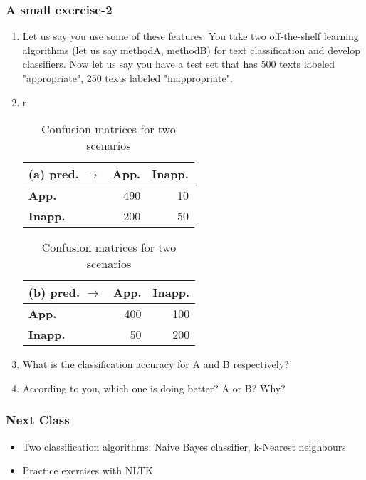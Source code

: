 \documentclass{beamer}
\begin{document}
\begin{frame}
\frametitle{A small exercise-2}
\begin{enumerate}
\item Let us say you use some of these features. You take two off-the-shelf learning algorithms (let us say methodA, methodB) for text classification and develop classifiers. Now let us say you have a test set that has 500 texts labeled "appropriate", 250 texts labeled "inappropriate".
\item \begin{table}[h]
\begin{center}
\begin{tabular}{r}
  \begin{tabular}{|l|r|r|}
    \hline
    (a) pred. $\rightarrow$&\textbf{App.}&\textbf{Inapp.}\\
    \hline
    \textbf{App.}&490&10\\ \hline
    \textbf{Inapp.}&200&50\\ \hline
    \end{tabular}
  \begin{tabular}{|l|r|r|}
    \hline
    (b) pred. $\rightarrow$&\textbf{App.}&\textbf{Inapp.}\\
    \hline
    \textbf{App.}&400&100\\ \hline
    \textbf{Inapp.}&50&200\\ \hline
    \end{tabular}
\end{tabular}
\caption{Confusion matrices for two scenarios}
\end{center}
\end{table}
\item What is the classification accuracy for A and B respectively? \pause
\item According to you, which one is doing better? A or B? Why? 
\end{enumerate}
\end{frame}

\begin{frame}
\frametitle{Next Class}
\begin{itemize}
\item Two classification algorithms: Naive Bayes classifier, k-Nearest neighbours
\item Practice exercises with NLTK
\end{itemize}
\end{frame}
\end{document}
